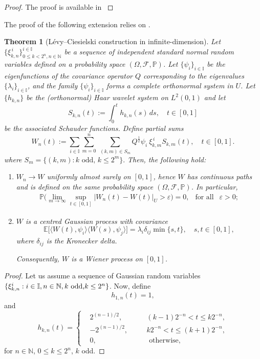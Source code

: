 \documentclass[english,a4paper,11pt]{amsart}
\theoremstyle{plain}
\newtheorem{theorem}{Theorem}[section]
\theoremstyle{definition}
\theoremstyle{remark}
\renewcommand{\emph}[1]{{\sl #1}}
\numberwithin{equation}{section}
\newcommand{\la}{\langle}
\newcommand{\ra}{\rangle}
\newcommand{\ep} {\varepsilon }
\newcommand{\N}{\mathbb{N}}
\renewcommand{\P}{\mathbb{P}}
\renewcommand{\emph}[1]{{\sl #1}}
\begin{document}
\begin{appendix}
\begin{proof} The proof is available in \cite[pp. 10--12]{Rogers}
\end{proof}
The proof of the following extension relies on \cite[Theorem 6.1]{Rogers}.
\begin{theorem}[Lévy--Ciesielski construction in infinite-dimension]\label{LCCthrm}
Let	{$\{\xi^{\,i}_{k,n}\}_{0\le k<2^n,n\in \N}^{i\in \mathbb{I}}$} be a sequence of independent standard normal random variables defined on a probability space 
$(\Omega,\mathcal F,\mathbb P)$.  Let $\{\psi_i\}_{i\in \mathbb{I}}$ be the eigenfunctions of the covariance operator $Q$ corresponding to the eigenvalues $\{\lambda_i\}_{i\in \mathbb{I}}$, and the family $\{\psi_i\}_{i\in \mathbb{I}}$  forms a complete orthonormal system in $U$.
	Let $\{h_{k,n}\}$ be the (orthonormal) Haar wavelet system on $L^2(0,1)$ and let
	\[
	S_{k,n}(t):=\int_0^t h_{k,n}(s)\,ds, \quad t\in[0,1]
	\]
	be the associated Schauder functions. Define partial sums
	\[
{	W_n(t):=\sum_{i\in \mathbb{I}}\sum_{m=0}^{n}\ \sum_{(k,m)\in S_{m}}Q^\frac{1}{2}\psi_i\ \xi^{\,i}_{k,m}S_{k,m}(t),\quad t\in[0,1].}
	\]
	where $S_m=\{(k,m): k \text{ odd, } k\leq 2^m\}.$
	Then, the following hold:
	\begin{enumerate}
		\item $W_n\to W$ \emph{uniformly almost surely} on $[0,1]$, hence $W$ has continuous paths and is defined on the same probability space $(\Omega,\mathcal F,\mathbb P)$. In particular,
			\begin{align*}
			\P \Big(\lim_{m\to\infty}\sup_{t\in[0,1]}\big|W_n(t)-W(t)\big|_U>\ep\Big)=0, \ \ \text{ for all }\ \ \ep>0;
		\end{align*}
		\item $W$ is a centred Gaussian process with covariance
		{	\[
	\mathbb E\big[\la W(t),\psi_i\ra \la W(s), \psi_j\ra ]=\lambda_i \delta_{ij}\min\{s,t\},\quad s,t\in[0,1],
		\]where $\delta_{ij}$ is the Kronecker delta.}
		
		Consequently, $W$ is a Wiener process on $[0,1]$.
	\end{enumerate}
\end{theorem}
\begin{proof}
	Let us assume a sequence of Gaussian random variables $\{\xi_{k,n}^i:i\in \mathbb{I},n\in\N, k \text{ odd,}\break k\leq 2^n\}$. 
	Now, define 
	\begin{equation*}
		h_{1,n}(t)=1,
			\end{equation*}and
			\begin{equation*}
	h_{k,n}(t)=
		\left\{\begin{aligned}
			&2^{(n-1)/2}, \quad &&(k-1)2^{-n}<t\leq k2^{-n},\\
			&-2^{(n-1)/2}, \quad  &&k2^{-n}<t\leq (k+1)2^{-n},\\
			&0, &&  \text{ otherwise},
		\end{aligned}
	\right.
	\end{equation*}for $n\in\N$, $0\leq k\leq 2^n$, $k$ odd. 


\end{proof}
\end{appendix}
\end{document}
